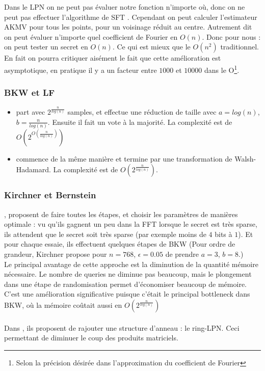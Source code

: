 \documentclass{article}		%
\theoremstyle{definition}
\theoremstyle{plain}
\theoremstyle{plain}
\theoremstyle{plain}
\theoremstyle{plain}
\begin{document}
Dans le LPN on ne peut pas évaluer notre fonction n'importe où, donc on
ne peut pas effectuer l'algorithme de SFT \cite{Akavia}. Cependant on peut calculer
l'estimateur AKMV pour tous les points, pour un voisinage réduit au
centre.  Autrement dit on peut évaluer n'importe quel coefficient de
Fourier en $O(n)$. Donc pour nous : on peut tester un secret en $O(n)$.
Ce qui est mieux que le $O(n^2)$ traditionnel. \\
En fait on pourra critiquer aisément le fait que cette amélioration est
asymptotique, en pratique il y a un facteur entre $1000$ et $10000$ dans
le O\footnote{Selon la précision désirée dans l'approximation du
coefficient de Fourier}. 
\subsubsection{BKW et LF}
\begin{itemize}
\item \cite{BKW} part avec $2^\frac{n}{log(n)}$ samples, et effectue une
réduction de taille avec $a=log(n)$, $b = \frac{n}{log(n)}$.
Ensuite il fait un vote à la majorité. La complexité
est de $O(2^{O(\frac {n} {log(n)})})$   
\item \cite{LF} commence de la même manière et termine par une
transformation de Walsh-Hadamard. La complexité est de
$O(2^\frac{n}{log(n)})$.
\end{itemize}
\subsubsection{Kirchner et Bernstein}
\cite{Bernstein}, \cite{Kirchner} proposent de faire toutes les étapes, et
choisir les paramètres de manières optimale : vu qu'ils gagnent un peu
dans la FFT lorsque le secret est très sparse, ils attendent que le
secret soit très sparse (par exemple moins de $4$ bits à $1$). Et pour
chaque essaie, ils effectuent quelques étapes de BKW (Pour ordre de
grandeur, Kirchner propose
pour $n=768$, $\epsilon=0.05$ de prendre $a=3$, $b=8$.)
\\Le principal avantage de cette approche est la diminution de la
quantité mémoire nécessaire. Le nombre de queries ne diminue pas
beaucoup, mais le plongement dans une étape de randomisation permet
d'économiser beaucoup de mémoire. C'est une amélioration significative
puisque c'était le principal bottleneck dans BKW, où la mémoire coûtait
aussi en $O(2^\frac{n}{log(n)})$ 
\\\\
Dans \cite{Bernstein}, ils proposent de rajouter une structure
d'anneau : le ring-LPN. Ceci permettant de diminuer le coup des produits
matriciels.  
\end{document}
